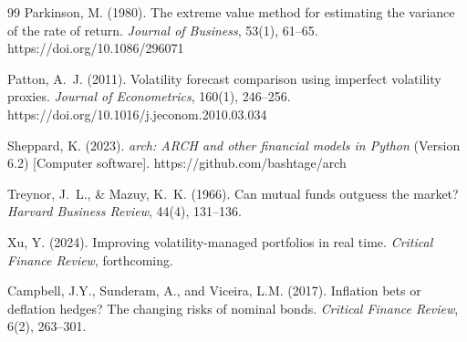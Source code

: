 \documentclass[12pt,a4paper]{article}
\begin{document}
\begin{thebibliography}{99}
Parkinson, M. (1980). The extreme value method for estimating the variance of the rate of return. \textit{Journal of Business}, 53(1), 61--65. https://doi.org/10.1086/296071

Patton, A.~J. (2011). Volatility forecast comparison using imperfect volatility proxies. \textit{Journal of Econometrics}, 160(1), 246--256. https://doi.org/10.1016/j.jeconom.2010.03.034

Sheppard, K. (2023). \textit{arch: ARCH and other financial models in Python} (Version 6.2) [Computer software]. https://github.com/bashtage/arch

Treynor, J.~L., \& Mazuy, K.~K. (1966). Can mutual funds outguess the market? \textit{Harvard Business Review}, 44(4), 131--136.

Xu, Y. (2024). Improving volatility-managed portfolios in real time. \textit{Critical Finance Review}, forthcoming.

Campbell, J.Y., Sunderam, A., and Viceira, L.M. (2017). Inflation bets or deflation hedges? The changing risks of nominal bonds. \textit{Critical Finance Review}, 6(2), 263--301.

\end{thebibliography}
\end{document}
